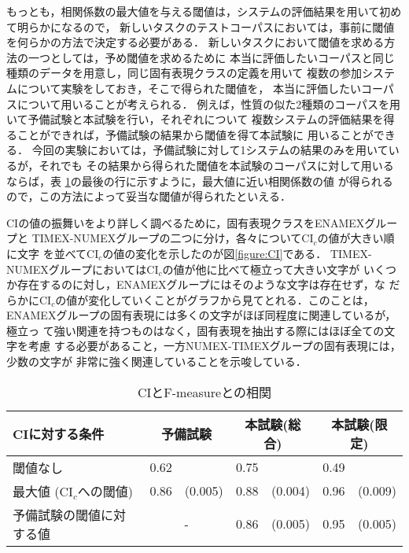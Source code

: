 もっとも，相関係数の最大値を与える閾値は，システムの評価結果を用いて初めて明らかになるので，
新しいタスクのテストコーパスにおいては，事前に閾値を何らかの方法で決定する必要がある．
新しいタスクにおいて閾値を求める方法の一つとしては，予め閾値を求めるために
本当に評価したいコーパスと同じ種類のデータを用意し，同じ固有表現クラスの定義を用いて
複数の参加システムについて実験をしておき，そこで得られた閾値を，
本当に評価したいコーパスについて用いることが考えられる．
例えば，性質の似た2種類のコーパスを用いて予備試験と本試験を行い，それぞれについて
複数システムの評価結果を得ることができれば，予備試験の結果から閾値を得て本試験に
用いることができる．
今回の実験においては，予備試験に対して1システムの結果のみを用いているが，それでも
その結果から得られた閾値を本試験のコーパスに対して用いるならば，表
\ref{table:index_CC_CI}の最後の行に示すように，最大値に近い相関係数の値
が得られるので，この方法によって妥当な閾値が得られたといえる．

CIの値の振舞いをより詳しく調べるために，固有表現クラスをENAMEXグループと
TIMEX-NUMEXグループの二つに分け，各々についてCI$_c$の値が大きい順に文字
を並べてCI$_c$の値の変化を示したのが図\ref{figure:CI}である．
TIMEX-NUMEXグループにおいてはCI$_c$の値が他に比べて極立って大きい文字が
いくつか存在するのに対し，ENAMEXグループにはそのような文字は存在せず，な
だらかにCI$_c$の値が変化していくことがグラフから見てとれる．このことは，
ENAMEXグループの固有表現には多くの文字がほぼ同程度に関連しているが，極立っ
て強い関連を持つものはなく，固有表現を抽出する際にはほぼ全ての文字を考慮
する必要があること，一方NUMEX-TIMEXグループの固有表現には，少数の文字が
非常に強く関連していることを示唆している．

\begin{table}[t]\small
\caption{\label{table:index_CC_CI}CIとF-measureとの相関}
\begin{center}
\begin{tabular}{|l|rr|rr|rr|} \hline
CIに対する条件              & \multicolumn{2}{c|}{予備試験}    & \multicolumn{2}{c|}{本試験(総合)} & \multicolumn{2}{c|}{本試験(限定)} \\ \hline \hline
閾値なし                    & 0.62        &         & 0.75 &         & 0.49 &         \\ \hline
最大値 (CI$_c$への閾値)     & 0.86        & (0.005) & 0.88 & (0.004) & 0.96 & (0.009) \\ \hline
予備試験の閾値に対する値    & \multicolumn{2}{c|}{-} & 0.86 & (0.005) & 0.95 & (0.005) \\ \hline
\end{tabular}
\end{center}
\end{table}

